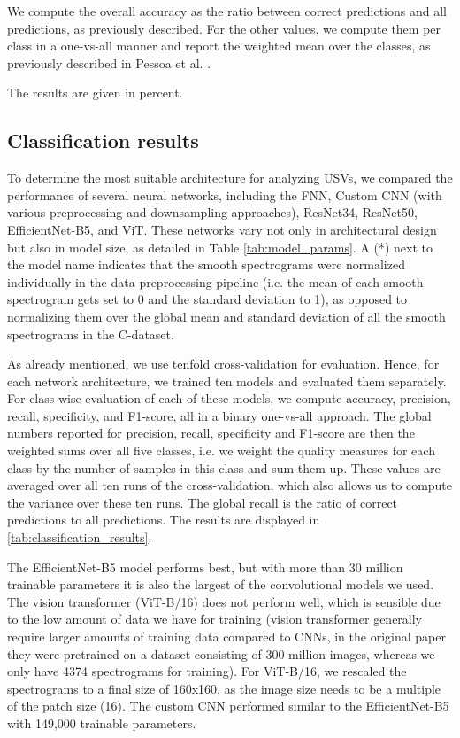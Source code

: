 \documentclass[preprint,NumberedRefs]{JASA}
\begin{document}
We compute the overall accuracy as the ratio between correct predictions and all predictions, as previously described. \cite{Pessoa2022-sy, 10.7554/eLife.59161}
%
For the other values, we compute them per class in a one-vs-all manner and report the weighted mean over the classes, as previously described in Pessoa et al. \cite{Pessoa2022-sy}.

The results are given in percent.


\subsection{Classification results}
\label{sec:Fully_automated_classification}

To determine the most suitable architecture for analyzing USVs, we compared the performance of several neural networks, including the FNN, Custom CNN (with various preprocessing and downsampling approaches), ResNet34, ResNet50, EfficientNet-B5, and ViT. These networks vary not only in architectural design but also in model size, as detailed in Table \ref{tab:model_params}.
A (*) next to the model name indicates that the smooth spectrograms were normalized individually in the data preprocessing pipeline (i.e. the mean of each smooth spectrogram gets set to 0 and the standard deviation to 1), as opposed to normalizing them over the global mean and standard deviation of all the smooth spectrograms in the C-dataset.

As already mentioned, we use tenfold cross-validation for evaluation. Hence, for each network architecture, we trained ten models and evaluated them separately. For class-wise evaluation of each of these models, we compute accuracy, precision, recall, specificity, and F1-score, all in a binary one-vs-all approach.
The global numbers reported for precision, recall, specificity and F1-score are then the weighted sums over all five classes, i.e. we weight the quality measures for each class by the number of samples in this class and sum them up. These values are averaged over all ten runs of the cross-validation, which also allows us to compute the variance over these ten runs.
The global recall is the ratio of correct predictions to all predictions.
The results are displayed in \autoref{tab:classification_results}.

The EfficientNet-B5 model performs best, but with more than 30 million trainable parameters it is also the largest of the convolutional models we used.
The vision transformer (ViT-B/16) does not perform well, which is sensible due to the low amount of data we have for training (vision transformer generally require larger amounts of training data compared to CNNs, in the original paper they were pretrained on a dataset consisting of 300 million images, whereas we only have 4374 spectrograms for training). \cite{ViT}
For ViT-B/16, we rescaled the spectrograms to a final size of 160x160, as the image size needs to be a multiple of the patch size (16).
The custom CNN performed similar to the EfficientNet-B5 with 149,000 trainable parameters. 
\end{document}
